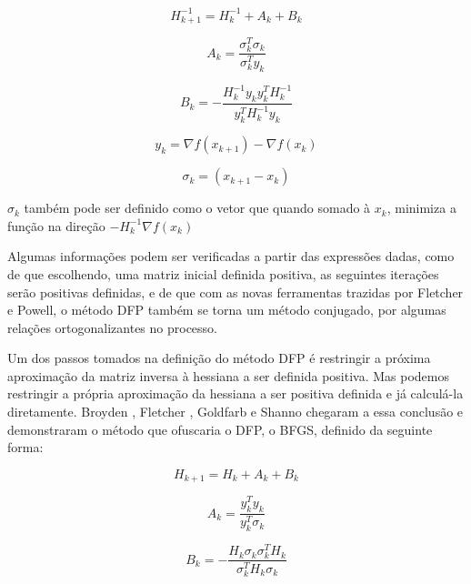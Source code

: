 \begin{equation*}
H^{-1}_{k+1} = H^{-1}_{k} + A_k + B_k
\end{equation*}

\begin{equation*}
A_k =  \frac{\sigma_k^T \sigma_k}{\sigma_k^T y_k}
\end{equation*}

\begin{equation*}
B_k = - \frac{   H^{-1}_k y_k y^T_k  H^{-1}_k  }{ y^T_k H^{-1}_k y_k}
\end{equation*}

\begin{equation*}
y_k = \nabla f(x_{k+1}) - \nabla f(x_k)
\end{equation*}

\begin{equation*}
\sigma_k = (x_{k+1} - x_k)
\end{equation*}

\(\sigma_k\) também pode ser definido como o vetor que quando somado à \(x_k\), minimiza a função na direção \(-H^{-1}_k \nabla f(x_k)\)

Algumas informações podem ser verificadas a partir das expressões dadas, como de que escolhendo, uma
matriz inicial definida positiva, as seguintes iterações serão positivas definidas, e de que com
as novas ferramentas trazidas por Fletcher e Powell, o método DFP também se torna um método
conjugado, por algumas relações ortogonalizantes no processo.

Um dos passos tomados na definição do método DFP é restringir a próxima aproximação da matriz
inversa à hessiana a ser definida positiva. Mas podemos restringir a própria aproximação da
hessiana a ser positiva definida e já calculá-la diretamente. Broyden \cite{BROYDEN_1970},
Fletcher \cite{Fletcher_1970}, Goldfarb \cite{Goldfarb_1970} e Shanno \cite{Shanno_1970} chegaram a
essa conclusão e demonstraram o método que ofuscaria o DFP, o BFGS, definido da seguinte forma:


\begin{equation*}
H_{k+1} = H_{k} + A_k + B_k
\end{equation*}

\begin{equation*}
A_k =  \frac{y_k^T y_k}{y_k^T \sigma_k}
\end{equation*}

\begin{equation*}
B_k = - \frac{   H_k \sigma_k \sigma^T_k  H_k  }{ \sigma^T_k H_k \sigma_k}
\end{equation*}

